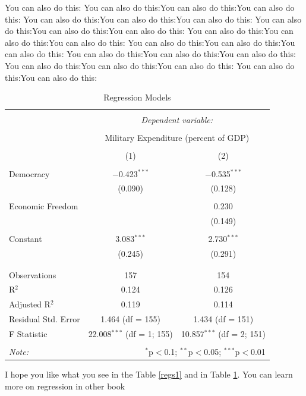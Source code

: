 \documentclass[11pt]{article}
\begin{document}
You can also do this: You can also do this:You can also do this:You can also do this: You can also do this:You can also do this:You can also do this: You can also do this:You can also do this:You can also do this: You can also do this:You can also do this:You can also do this: You can also do this:You can also do this:You can also do this: You can also do this:You can also do this:You can also do this: You can also do this:You can also do this:You can also do this: You can also do this:You can also do this:
\pagebreak

\begin{table}[!htbp] \centering 
  \caption{Regression Models} 
  \label{regs2} 
\begin{tabular}{@{\extracolsep{5pt}}lcc} 
\\[-1.8ex]\hline 
\hline \\[-1.8ex] 
 & \multicolumn{2}{c}{\textit{Dependent variable:}} \\ 
\cline{2-3} 
\\[-1.8ex] & \multicolumn{2}{c}{Military Expenditure (percent of GDP)} \\ 
\\[-1.8ex] & (1) & (2)\\ 
\hline \\[-1.8ex] 
 Democracy & $-$0.423$^{***}$ & $-$0.535$^{***}$ \\ 
  & (0.090) & (0.128) \\ 
  & & \\ 
 Economic Freedom &  & 0.230 \\ 
  &  & (0.149) \\ 
  & & \\ 
 Constant & 3.083$^{***}$ & 2.730$^{***}$ \\ 
  & (0.245) & (0.291) \\ 
  & & \\ 
\hline \\[-1.8ex] 
Observations & 157 & 154 \\ 
R$^{2}$ & 0.124 & 0.126 \\ 
Adjusted R$^{2}$ & 0.119 & 0.114 \\ 
Residual Std. Error & 1.464 (df = 155) & 1.434 (df = 151) \\ 
F Statistic & 22.008$^{***}$ (df = 1; 155) & 10.857$^{***}$ (df = 2; 151) \\ 
\hline 
\hline \\[-1.8ex] 
\textit{Note:}  & \multicolumn{2}{r}{$^{*}$p$<$0.1; $^{**}$p$<$0.05; $^{***}$p$<$0.01} \\ 
\end{tabular} 
\end{table} 
I hope you like what you see in the Table \ref{regs1} and in Table \ref{regs2}. You can learn more on regression in 
other book \citep[150-160]{petrie_introduction_2016}
\end{document}
